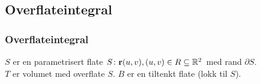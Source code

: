 \begin{frame}
  \subsection{Overflateintegral}
  \frametitle{Overflateintegral}
  \centerline{%
  }
  $S$ er en parametrisert flate $S \colon \mathbf{r}(u,v), (u,v) \in R \subseteq \mathbb{R}^2$ med rand $\partial S$. \\
  $T$ er volumet med overflate $S$. $B$ er en tiltenkt flate (lokk til $S$).
\end{frame}

